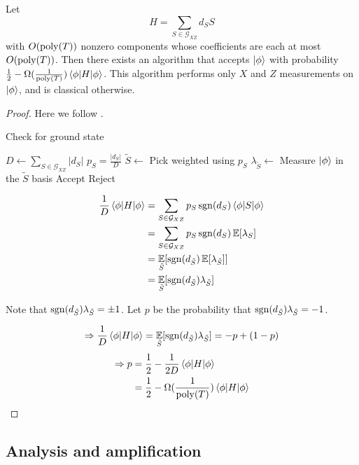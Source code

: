 \begin{theorem}
	Let $$H=\sum_{S\in\mathcal{G}_{XZ}} d_S S$$ with  $O(\operatorname*{\operatorname{poly}}(T))$ nonzero components whose coefficients are each at most $O(\operatorname*{\operatorname{poly}}(T))$.
	Then there exists an algorithm that accepts $\ket\phi$ with probability $\frac{1}{2}-\Omega(\frac{1}{\operatorname*{\operatorname{poly}}(T)})\braket{\phi|H|\phi}$. This algorithm performs only $X$ and $Z$ measurements on $\ket\phi$, and is classical otherwise.
\end{theorem}
\begin{proof}

Here we follow \cite{PhysRevA.93.022326}.

\begin{algorithm}
	\caption{Check for ground state}
	\begin{algorithmic}[1]
		\State $D\gets\sum_{S\in\mathcal{G}_{XZ}}|d_S|$
		\State $p_S=\frac{|d_S|}{D}$
		\State $\tilde{S}\gets$ Pick weighted using $p_S$
		\State $\lambda_{\tilde{S}}\gets$ Measure $\ket\phi$ in the $\tilde{S}$ basis
			\State Accept
		\Else
			\State Reject
		\EndIf
	\end{algorithmic}
\end{algorithm}

\begin{align*}
	\frac{1}{D}\braket{\phi|H|\phi}&=\sum_{S\in\mathcal{G}_{XZ}} p_S\operatorname{sgn}(d_S)\braket{\phi|S|\phi}\\
	&=\sum_{S\in\mathcal{G}_{XZ}} p_S\operatorname{sgn}(d_S)\operatorname*{\mathbb{E}}[\lambda_S]\\
	&=\operatorname*{\mathbb{E}}_{\tilde{S}}[\operatorname{sgn}(d_{\tilde{S}})\operatorname*{\mathbb{E}}[\lambda_{\tilde{S}}]]\\
	&=\operatorname*{\mathbb{E}}_{\tilde{S}}[\operatorname{sgn}(d_{\tilde{S}})\lambda_{\tilde{S}}]
\end{align*}

Note that $\operatorname{sgn}(d_{\tilde{S}})\lambda_{\tilde{S}}=\pm1$. Let $p$ be the probability that $\operatorname{sgn}(d_{\tilde{S}})\lambda_{\tilde{S}}=-1$.

$$\Rightarrow \frac{1}{D}\braket{\phi|H|\phi}=\operatorname*{\mathbb{E}}_{\tilde{S}}[\operatorname{sgn}(d_{\tilde{S}})\lambda_{\tilde{S}}]=-p+(1-p)$$
\begin{align*}
	\Rightarrow p&=\frac{1}{2}-\frac{1}{2D}\braket{\phi|H|\phi}\\
	&=\frac{1}{2}-\Omega(\frac{1}{\operatorname*{\operatorname{poly}}(T)})\braket{\phi|H|\phi}
\end{align*}

\end{proof}

\subsection{Analysis and amplification}

